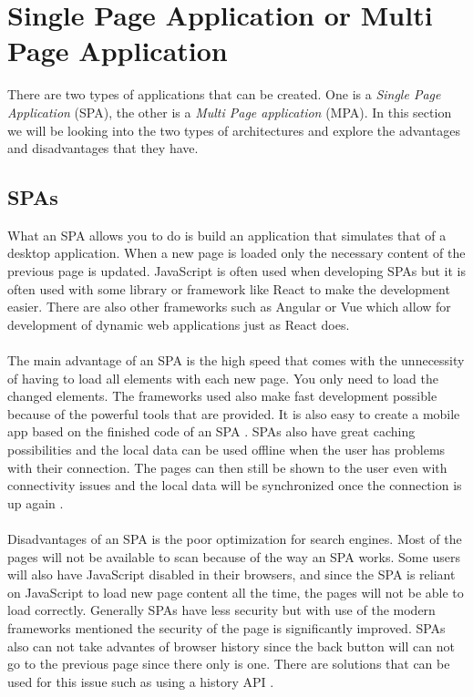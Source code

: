 \section{Single Page Application or Multi Page Application}
There are two types of applications that can be created.
One is a \textit{Single Page Application} (SPA), the other is a \textit{Multi Page application} (MPA).
In this section we will be looking into the two types of architectures and explore the advantages and disadvantages that they have.

\subsection{SPAs}
What an SPA allows you to do is build an application that simulates that of a desktop application. 
When a new page is loaded only the necessary content of the previous page is updated.
JavaScript is often used when developing SPAs but it is often used with some library or framework like React to make the development easier.
There are also other frameworks such as Angular or Vue which allow for development of dynamic web applications just as React does. 
\\\\
The main advantage of an SPA is the high speed that comes with the unnecessity of having to load all elements with each new page.
You only need to load the changed elements. 
The frameworks used also make fast development possible because of the powerful tools that are provided. 
It is also easy to create a mobile app based on the finished code of an SPA \cite{SPAvsMPAMerehead}.
SPAs also have great caching possibilities and the local data can be used offline when the user has problems with their connection. 
The pages can then still be shown to the user even with connectivity issues and the local data will be synchronized once the connection is up again \cite{SPAvsMPARuby}.
\\\\
Disadvantages of an SPA is the poor optimization for search engines. Most of the pages will not be available to scan because of the way an SPA works. 
Some users will also have JavaScript disabled in their browsers, and since the SPA is reliant on JavaScript to load new page content all the time, the pages will not be able to load correctly.
Generally SPAs have less security but with use of the modern frameworks mentioned the security of the page is significantly improved.
SPAs also can not take advantes of browser history since the back button will can not go to the previous page since there only is one. 
There are solutions that can be used for this issue such as using a history API \cite{SPAvsMPAMerehead}.

